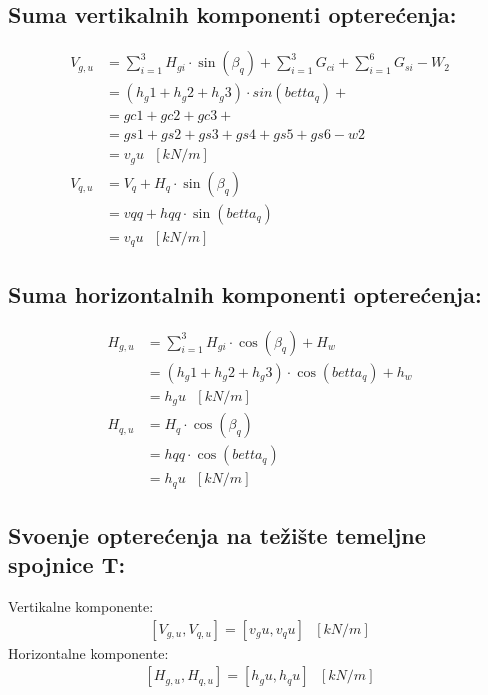 \documentclass[a4paper, 11pt]{article}
\begin{document}
\subsection*{Suma vertikalnih komponenti optere\'cenja:}

\begin{align*}
V_{g,u} &= \sum_{i=1}^{3} H_{gi} \cdot \sin(\beta_{q}) + \sum_{i=1}^3 {G_{ci}} + \sum_{i=1}^{6} {G_{si}} -W_{2} \\
		&= \left( h_g1 + h_g2 + h_g3 \right) \cdot sin(betta_q)+  \\
		&= gc1+gc2+gc3 + \\
		&= gs1+gs2+gs3+gs4+gs5+gs6 - w2 \\
		&= v_gu \text{ } [kN/m] \\
V_{q,u} &= V_{q} + H_{q} \cdot \sin(\beta_{q}) \\
		&= vqq + hqq \cdot \sin (betta_q) \\
		&= v_qu \text{ } [kN/m]
\end{align*}

\subsection*{Suma horizontalnih komponenti optere\'cenja:}

\begin{align*}
H_{g,u} &= \sum_{i=1}^{3} H_{gi} \cdot \cos(\beta_{q}) + H_{w} \\
		&=  \left( h_g1 + h_g2 + h_g3 \right) \cdot \cos (betta_q) + h_w \\
		&= h_gu \text{ } [kN/m] \\
H_{q,u} &= H_{q} \cdot \cos (\beta_{q}) \\
		&= hqq \cdot \cos (betta_q) \\
		&= h_qu \text{ } [kN/m]
\end{align*}

\subsection*{Svo\dj enje optere\'cenja na te\v{z}i\v{s}te temeljne spojnice T:}
Vertikalne komponente:
\begin{align*}
\left[V_{g,u}, V_{q,u} \right] = \left[v_gu, v_qu \right] \text{ } [kN/m]
\end{align*}
Horizontalne komponente:
\begin{align*}
\left[ H_{g,u}, H_{q,u} \right] = \left[ h_gu, h_qu \right] \text{ } [kN/m]
\end{align*}
\end{document}
